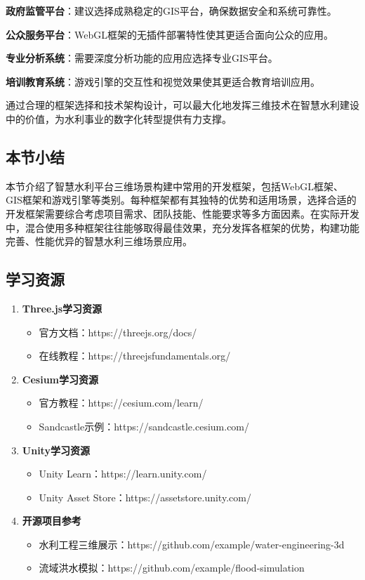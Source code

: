 \textbf{政府监管平台}：建议选择成熟稳定的GIS平台，确保数据安全和系统可靠性。

\textbf{公众服务平台}：WebGL框架的无插件部署特性使其更适合面向公众的应用。

\textbf{专业分析系统}：需要深度分析功能的应用应选择专业GIS平台。

\textbf{培训教育系统}：游戏引擎的交互性和视觉效果使其更适合教育培训应用。

通过合理的框架选择和技术架构设计，可以最大化地发挥三维技术在智慧水利建设中的价值，为水利事业的数字化转型提供有力支撑。

\subsection{本节小结}\label{ux672cux8282ux5c0fux7ed3}

本节介绍了智慧水利平台三维场景构建中常用的开发框架，包括WebGL框架、GIS框架和游戏引擎等类别。每种框架都有其独特的优势和适用场景，选择合适的开发框架需要综合考虑项目需求、团队技能、性能要求等多方面因素。在实际开发中，混合使用多种框架往往能够取得最佳效果，充分发挥各框架的优势，构建功能完善、性能优异的智慧水利三维场景应用。

\subsection{学习资源}\label{ux5b66ux4e60ux8d44ux6e90}

\begin{enumerate}
\def\labelenumi{\arabic{enumi}.}
\tightlist
\item
  \textbf{Three.js学习资源}

  \begin{itemize}
  \tightlist
  \item
    官方文档：https://threejs.org/docs/
  \item
    在线教程：https://threejsfundamentals.org/
  \end{itemize}
\item
  \textbf{Cesium学习资源}

  \begin{itemize}
  \tightlist
  \item
    官方教程：https://cesium.com/learn/
  \item
    Sandcastle示例：https://sandcastle.cesium.com/
  \end{itemize}
\item
  \textbf{Unity学习资源}

  \begin{itemize}
  \tightlist
  \item
    Unity Learn：https://learn.unity.com/
  \item
    Unity Asset Store：https://assetstore.unity.com/
  \end{itemize}
\item
  \textbf{开源项目参考}

  \begin{itemize}
  \tightlist
  \item
    水利工程三维展示：https://github.com/example/water-engineering-3d
  \item
    流域洪水模拟：https://github.com/example/flood-simulation
  \end{itemize}
\end{enumerate}
